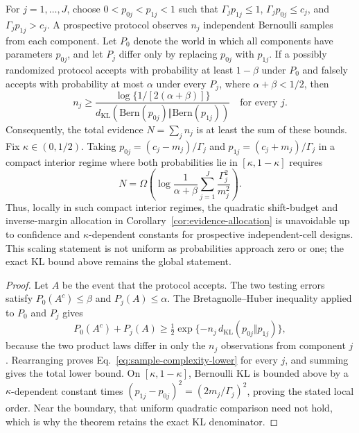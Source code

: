 \begin{theorem}
\label{thm:sample-complexity-lower}
For $j=1,\ldots,J$, choose $0<p_{0j}<p_{1j}<1$ such that
$\Gamma_jp_{1j}\leq1$, $\Gamma_jp_{0j}\leq c_j$, and
$\Gamma_jp_{1j}>c_j$. A prospective protocol observes $n_j$ independent
Bernoulli samples from each component. Let $P_0$ denote the world in which all
components have parameters $p_{0j}$, and let $P_j$ differ only by replacing
$p_{0j}$ with $p_{1j}$. If a possibly randomized protocol accepts with
probability at least $1-\beta$ under $P_0$ and falsely accepts with probability
at most $\alpha$ under every $P_j$, where $\alpha+\beta<1/2$, then
\begin{equation}
 n_j\geq
 \frac{\log\{1/[2(\alpha+\beta)]\}}
 {d_{\mathrm{KL}}(\mathrm{Bern}(p_{0j})\Vert
                  \mathrm{Bern}(p_{1j}))}
 \quad\text{for every }j.
 \label{eq:sample-complexity-lower}
\end{equation}
Consequently, the total evidence $N=\sum_jn_j$ is at least the sum of these
bounds. Fix $\kappa\in(0,1/2)$. Taking
$p_{0j}=(c_j-m_j)/\Gamma_j$ and
$p_{1j}=(c_j+m_j)/\Gamma_j$ in a compact interior regime where both
probabilities lie in $[\kappa,1-\kappa]$ requires
\begin{equation}
 N=\Omega\left(
 \log\frac{1}{\alpha+\beta}
 \sum_{j=1}^J\frac{\Gamma_j^2}{m_j^2}
 \right).
\end{equation}
Thus, locally in such compact interior regimes, the quadratic shift-budget and
inverse-margin allocation in Corollary~\ref{cor:evidence-allocation} is
unavoidable up to confidence and $\kappa$-dependent constants for prospective
independent-cell designs. This scaling statement is not uniform as probabilities
approach zero or one; the exact KL bound above remains the global statement.
\end{theorem}

\begin{proof}
Let $A$ be the event that the protocol accepts. The two testing errors satisfy
$P_0(A^c)\leq\beta$ and $P_j(A)\leq\alpha$. The
Bretagnolle--Huber inequality applied to $P_0$ and $P_j$ gives
\begin{equation}
 P_0(A^c)+P_j(A)
 \geq\tfrac12\exp\{-n_j\,d_{\mathrm{KL}}(p_{0j}\Vert p_{1j})\},
\end{equation}
because the two product laws differ in only the $n_j$ observations from
component $j$. Rearranging proves Eq.~\eqref{eq:sample-complexity-lower} for
every $j$, and summing gives the total lower bound. On
$[\kappa,1-\kappa]$, Bernoulli KL is bounded above by a
$\kappa$-dependent constant times
$(p_{1j}-p_{0j})^2=(2m_j/\Gamma_j)^2$, proving the stated local order. Near the
boundary, that uniform quadratic comparison need not hold, which is why the
theorem retains the exact KL denominator.
\end{proof}

